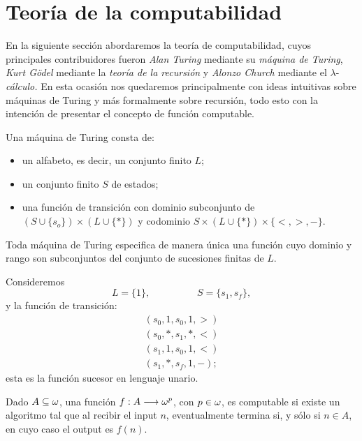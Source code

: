 \section{Teoría de la computabilidad}
\label{sec16}
En la siguiente sección abordaremos la teoría de computabilidad, cuyos principales contribuidores fueron \textit{Alan Turing} mediante su \textit{máquina de Turing}, \textit{Kurt Gödel} mediante la \textit{teoría de la recursión} y \textit{Alonzo Church} mediante el $\lambda$-\textit{cálculo.} En esta ocasión nos quedaremos principalmente con ideas intuitivas sobre máquinas de Turing y más formalmente sobre recursión, todo esto con la intención de presentar el concepto de función computable. 

\begin{defn}
    Una máquina de Turing consta de:
    \begin{itemize}
        \item un alfabeto, es decir, un conjunto finito $L$;
        \item un conjunto finito $S$ de estados;
        \item una función de transición con dominio subconjunto de $(S\cup\{s_o\})\times(L\cup\{*\})$ y codominio $S\times(L\cup\{*\})\times\{<,>,-\}$.
    \end{itemize}
\end{defn}

\begin{obs}
    Toda máquina de Turing especifica de manera única una función cuyo dominio y rango son subconjuntos del conjunto de sucesiones finitas de $L$.
\end{obs}

\begin{ex}
    Consideremos 
    \[L=\{1\},\hspace{2cm}S=\{s_1,s_f\},\]
    y la función de transición:
    \[\begin{array}{c}
        (s_0,1,s_0,1,>)\\
        (s_0,*,s_1,*,<)\\
        (s_1,1,s_0,1,<)\\
        (s_1,*,s_f,1,-);
    \end{array}\]
    esta es la función sucesor en lenguaje unario.
\end{ex}

\begin{defn}
    Dado $A\subseteq \omega$, una función $f:A\longrightarrow\omega^p$, con $p\in\omega$, es computable si existe un algoritmo tal que al recibir el input $n$, eventualmente termina si, y sólo si $n\in A$, en cuyo caso el output es $f(n)$.
\end{defn}


